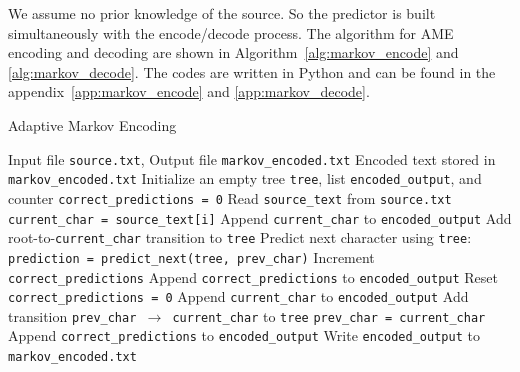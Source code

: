 \documentclass[12pt,twoside]{article}
\begin{document}
We assume no prior knowledge of the source. So the predictor is built simultaneously with the encode/decode process. The algorithm for AME encoding and decoding are shown in Algorithm~\ref{alg:markov_encode} and \ref{alg:markov_decode}. The codes are written in Python and can be found in the appendix~\ref{app:markov_encode} and \ref{app:markov_decode}.

\begin{algorithm}
    \caption{Adaptive Markov Encoding}
    \label{alg:markov_encode}
    \begin{algorithmic}[1]
    \REQUIRE Input file \texttt{source.txt}, Output file \texttt{markov\_encoded.txt}
    \ENSURE Encoded text stored in \texttt{markov\_encoded.txt}
    \STATE Initialize an empty tree \texttt{tree}, list \texttt{encoded\_output}, and counter \texttt{correct\_predictions = 0}
    \STATE Read \texttt{source\_text} from \texttt{source.txt}
        \STATE \texttt{current\_char = source\_text[i]}
            \STATE Append \texttt{current\_char} to \texttt{encoded\_output}
            \STATE Add root-to-\texttt{current\_char} transition to \texttt{tree}
        \ELSE
            \STATE Predict next character using \texttt{tree}: \texttt{prediction = predict\_next(tree, prev\_char)}
                \STATE Increment \texttt{correct\_predictions}
            \ELSE
                    \STATE Append \texttt{correct\_predictions} to \texttt{encoded\_output}
                    \STATE Reset \texttt{correct\_predictions = 0}
                \ENDIF
                \STATE Append \texttt{current\_char} to \texttt{encoded\_output}
            \ENDIF
            \STATE Add transition \texttt{prev\_char $\to$ current\_char} to \texttt{tree}
        \ENDIF
        \STATE \texttt{prev\_char = current\_char}
    \ENDFOR
        \STATE Append \texttt{correct\_predictions} to \texttt{encoded\_output}
    \ENDIF
    \STATE Write \texttt{encoded\_output} to \texttt{markov\_encoded.txt}
    \end{algorithmic}
\end{algorithm}
\end{document}

